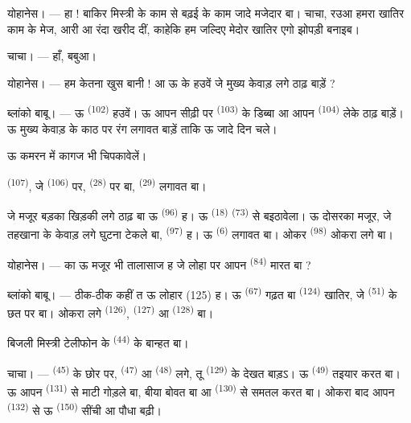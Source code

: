 \textsc{योहानेस}। --- हा ! बाकिर मिस्त्री के काम से बढ़ई के काम जादे
मजेदार बा। चाचा, रउआ हमरा खातिर काम के मेज, आरी आ रंदा खरीद दीं, काहेकि
हम जल्दिए मेदोर खातिर एगो झोपड़ी बनाइब।

\textsc{चाचा}। --- हाँ, बबुआ।

\textsc{योहानेस}। --- हम केतना खुस बानी ! आ ऊ के हउवें जे मुख्य केवाड़
लगे ठाढ़ बाड़ें ?

\VUsaut{3.0mm}
\VUsaut{3.0mm}

\textsc{ब्लांको बाबू}। --- ऊ  \textsuperscript{(102)}
हउवें। ऊ आपन सीढ़ी पर  \textsuperscript{(103)} के डिब्बा आ
आपन  \textsuperscript{(104)} लेके ठाढ़ बाड़ें। ऊ मुख्य
केवाड़ के काठ पर रंग लगावत बाड़ें ताकि ऊ जादे दिन चले।

ऊ कमरन में कागज भी चिपकावेलें।

 \textsuperscript{(107)}, जे 
\textsuperscript{(106)} पर,  \textsuperscript{(28)} पर बा,
 \textsuperscript{(29)} लगावत बा।

जे मजूर बड़का खिड़की लगे ठाढ़ बा ऊ 
\textsuperscript{(96)} ह। ऊ  \textsuperscript{(18)}
 \textsuperscript{(73)} से बइठावेला। ऊ दोसरका मजूर, जे
तहखाना के केवाड़ लगे घुटना टेकले बा, 
\textsuperscript{(97)} ह। ऊ  \textsuperscript{(6)} लगावत बा।
ओकर  \textsuperscript{(98)} ओकरा लगे बा।

\textsc{योहानेस}। --- का ऊ मजूर भी तालासाज ह जे लोहा पर आपन
 \textsuperscript{(84)} मारत बा ?

\textsc{ब्लांको बाबू}। --- ठीक-ठीक कहीं त ऊ लोहार (125) ह। ऊ
 \textsuperscript{(67)} गढ़त बा  \textsuperscript{(124)} खातिर, जे 
\textsuperscript{(51)} के छत पर बा। ओकरा लगे 
\textsuperscript{(126)},  \textsuperscript{(127)} आ
 \textsuperscript{(128)} बा।

बिजली मिस्त्री टेलीफोन के  \textsuperscript{(44)} के
 बान्हत बा।

\VUsaut{3.0mm}

\textsc{चाचा}। ---  \textsuperscript{(45)} के छोर पर,
 \textsuperscript{(47)} आ 
\textsuperscript{(48)} लगे, तू  \textsuperscript{(129)} के
देखत बाड़ऽ। ऊ  \textsuperscript{(49)} तइयार करत बा। ऊ
आपन  \textsuperscript{(131)} से माटी गोड़ले बा, बीया बोवत
बा आ  \textsuperscript{(130)} से समतल करत बा। ओकरा बाद आपन
 \textsuperscript{(132)} से ऊ 
\textsuperscript{(150)} सींची आ पौधा बढ़ी।

